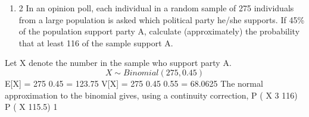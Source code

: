 \documentclass[a4paper,12pt]{article}
\begin{document}

\begin{enumerate}

\item 
2 In an opinion poll, each individual in a random sample of 275 individuals from a large population is asked which political party he/she supports. If 45\% of the population
support party A, calculate (approximately) the probability that at least 116 of the sample support A.

\end{enumerate}
Let X denote the number in the sample who support party A.
\[X \sim Binomial(275, 0.45)\]
E[X] = 275 0.45 = 123.75
V[X] = 275 0.45 0.55 = 68.0625
The normal approximation to the binomial gives, using a continuity correction,
P ( X
3
116)
P ( X
115.5) 1
\end{document}
